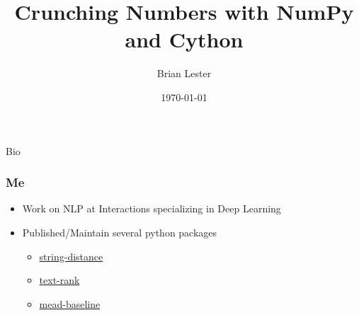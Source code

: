 \documentclass{beamer}
\title{Crunching Numbers with NumPy and Cython}
\author{Brian Lester}
\institute{interactions}
\date{\today}
\begin{document}
\def\R{\mathbb{R}}
\frame{\titlepage}

\begin{section}{Bio}

\begin{frame}
    \frametitle{Me}
    \begin{itemize}
        \item Work on NLP at Interactions specializing in Deep Learning
        \item Published/Maintain several python packages
        \begin{itemize}
            \item \href{https://github.com/blester125/string-distance}{string-distance}
            \item \href{https://github.com/blester125/text-rank}{text-rank}
            \item \href{https://github.com/dpressel/mead-baseline}{mead-baseline}
        \end{itemize}
    \end{itemize}
\end{frame}

\end{section}
\end{document}
